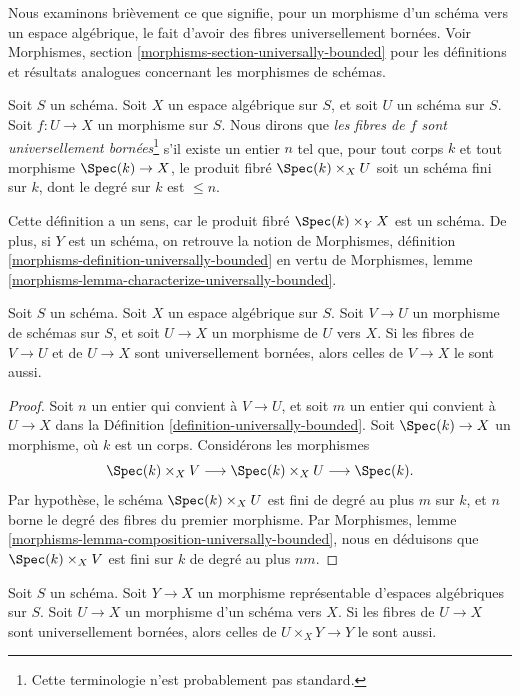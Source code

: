 \noindent
Nous examinons brièvement ce que signifie, pour un morphisme d'un schéma vers
un espace algébrique, le fait d'avoir des fibres universellement bornées. Voir
Morphismes, section \ref{morphisms-section-universally-bounded}
pour les définitions et résultats analogues concernant les morphismes de
schémas.

\begin{definition}
\label{definition-universally-bounded}
Soit $S$ un schéma. Soit $X$ un espace algébrique sur $S$, et soit
$U$ un schéma sur $S$. Soit $f : U \to X$ un morphisme sur $S$.
Nous dirons que {\it les fibres de $f$ sont universellement
bornées}\footnote{Cette terminologie n'est probablement pas standard.}
s'il existe un entier $n$ tel que, pour tout corps $k$ et tout morphisme
$\Spec(k) \to X$, le produit fibré $\Spec(k) \times_X U$ soit un schéma fini
sur $k$, dont le degré sur $k$ est $\leq n$.
\end{definition}

\noindent
Cette définition a un sens, car le produit fibré
$\Spec(k) \times_Y X$ est un schéma. De plus, si $Y$ est un schéma,
on retrouve la notion de
Morphismes, définition \ref{morphisms-definition-universally-bounded}
en vertu de
Morphismes, lemme \ref{morphisms-lemma-characterize-universally-bounded}.

\begin{lemma}
\label{lemma-composition-universally-bounded}
Soit $S$ un schéma. Soit $X$ un espace algébrique sur $S$.
Soit $V \to U$ un morphisme de schémas sur $S$, et soit
$U \to X$ un morphisme de $U$ vers $X$. Si les fibres de
$V \to U$ et de $U \to X$ sont universellement bornées, alors celles de
$V \to X$ le sont aussi.
\end{lemma}

\begin{proof}
Soit $n$ un entier qui convient à $V \to U$, et soit $m$ un entier qui
convient à $U \to X$ dans la
Définition \ref{definition-universally-bounded}.
Soit $\Spec(k) \to X$ un morphisme, où $k$ est un corps.
Considérons les morphismes
$$
\Spec(k) \times_X V
\longrightarrow
\Spec(k) \times_X U
\longrightarrow
\Spec(k).
$$
Par hypothèse, le schéma $\Spec(k) \times_X U$ est fini de degré au plus $m$
sur $k$, et $n$ borne le degré des fibres du premier morphisme. Par
Morphismes, lemme \ref{morphisms-lemma-composition-universally-bounded},
nous en déduisons que $\Spec(k) \times_X V$ est fini sur $k$ de degré au plus
$nm$.
\end{proof}

\begin{lemma}
\label{lemma-base-change-universally-bounded}
Soit $S$ un schéma.
Soit $Y \to X$ un morphisme représentable d'espaces algébriques sur $S$.
Soit $U \to X$ un morphisme d'un schéma vers $X$.
Si les fibres de $U \to X$ sont universellement bornées, alors celles de
$U \times_X Y \to Y$ le sont aussi.
\end{lemma}

